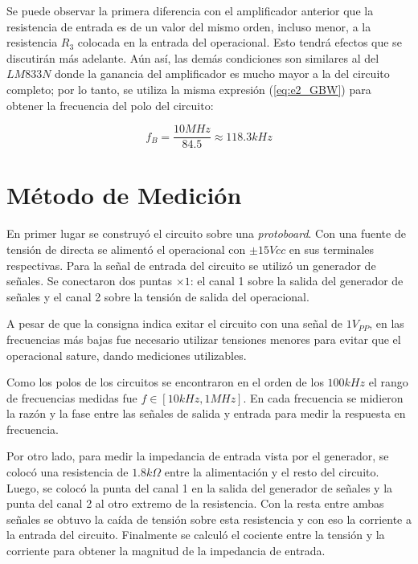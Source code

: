 Se puede observar la primera diferencia con el amplificador anterior que la resistencia de entrada es de un valor del mismo orden, incluso menor, a la resistencia $R_3$ colocada en la entrada del operacional. Esto tendrá efectos que se discutirán más adelante.
Aún así, las demás condiciones son similares al del $LM833N$ donde la ganancia del amplificador es mucho mayor a la del circuito completo; por lo tanto, se utiliza la misma expresión (\ref{eq:e2_GBW}) para obtener la frecuencia del polo del circuito:

\begin{equation}
f_B= \frac{10 MHz}{84.5} \approx 118.3 kHz
\label{val:e2_fB_ne}
\end{equation}

\section{Método de Medición}

En primer lugar se construyó el circuito sobre una \textit{protoboard}. Con una fuente de tensión de directa se alimentó el operacional con $\pm 15 Vcc$ en sus terminales respectivas. Para la señal de entrada del circuito se utilizó un generador de señales. Se conectaron dos puntas $\times 1$: el canal 1 sobre la salida del generador de señales y el canal 2 sobre la tensión de salida del operacional.

A pesar de que la consigna indica exitar el circuito con una señal de $1 V_{PP}$, en las frecuencias más bajas fue necesario utilizar tensiones menores para evitar que el operacional sature, dando mediciones utilizables.

Como los polos de los circuitos se encontraron en el orden de los $100 kHz$ el rango de frecuencias medidas fue $f\in[10 kHz , 1 MHz]$. En cada frecuencia se midieron la razón y la fase entre las señales de salida y entrada para medir la respuesta en frecuencia.

Por otro lado, para medir la impedancia de entrada vista por el generador, se colocó una resistencia de $1.8 k\Omega$ entre la alimentación y el resto del circuito. Luego, se colocó la punta del canal 1 en la salida del generador de señales y la punta del canal 2 al otro extremo de la resistencia. Con la resta entre ambas señales se obtuvo la caída de tensión sobre esta resistencia y con eso la corriente a la entrada del circuito. Finalmente se calculó el cociente entre la tensión y la corriente para obtener la magnitud de la impedancia de entrada.

